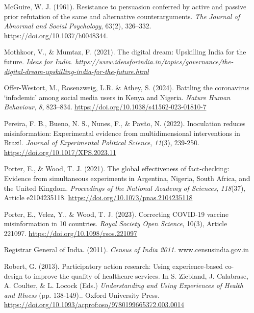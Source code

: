 \documentclass[authordate, reflection]{jote-new-article}
\begin{document}
	McGuire, W. J. (1961). Resistance to persuasion conferred by active and passive prior refutation of the same and alternative counterarguments. \emph{The Journal of Abnormal and Social Psychology}, 63(2), 326--332. \url{https://doi.org/10.1037/h0048344.}



	Mothkoor, V., \& Mumtaz, F. (2021). The digital dream: Upskilling India for the future. \emph{Ideas for India. \url{https://www.ideasforindia.in/topics/governance/the-digital-dream-upskilling-india-for-the-future.html}}



	Offer-Westort, M., Rosenzweig, L.R. \& Athey, S. (2024). Battling the coronavirus ‘infodemic' among social media users in Kenya and Nigeria. \emph{Nature Human Behaviour}, \emph{8}, 823--834. \url{https://doi.org/10.1038/s41562-023-01810-7}



	Pereira, F. B., Bueno, N. S., Nunes, F., \& Pavão, N. (2022). Inoculation reduces misinformation: Experimental evidence from multidimensional interventions in Brazil. \emph{Journal of Experimental Political Science}, \emph{11}(3), 239-250. \url{https://doi.org/10.1017/XPS.2023.11}



	Porter, E., \& Wood, T. J. (2021). The global effectiveness of fact-checking: Evidence from simultaneous experiments in Argentina, Nigeria, South Africa, and the United Kingdom. \emph{Proceedings of the National Academy of Sciences}, \emph{118}(37), Article e2104235118. \url{https://doi.org/10.1073/pnas.2104235118}



	Porter, E., Velez, Y., \& Wood, T. J. (2023). Correcting COVID-19 vaccine misinformation in 10 countries. \emph{Royal Society Open Science}, 10(3), Article 221097. \url{https://doi.org/10.1098/rsos.221097}



	Registrar General of India. (2011). \emph{Census of India 2011}. www.censusindia.gov.in



	Robert, G. (2013). Participatory action research: Using experience-based co-design to improve the quality of healthcare services. In S. Ziebland, J. Calabrase, A. Coulter, \& L. Locock (Eds.) \emph{Understanding and Using Experiences of Health and Illness }(pp. 138-149)\emph{.}. Oxford University Press. \url{https://doi.org/10.1093/acprof:oso/9780199665372.003.0014}
\end{document}
